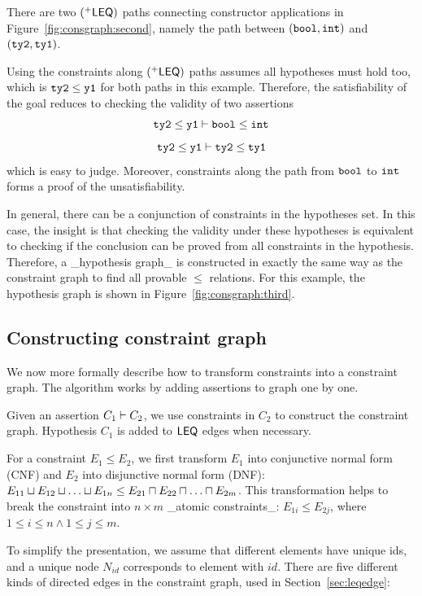 There are two $(^{+}\mathsf{LEQ})$ paths connecting constructor
applications in Figure~\ref{fig:consgraph:second}, namely the path
between $(\mathtt{bool, int})$ and $(\mathtt{ty2, ty1})$. 

Using the constraints along $(^{+}\mathsf{LEQ})$ paths assumes all
hypotheses must hold too, which is $\mathtt{ty2}\leq \mathtt{y1}$ for
both paths in this example. Therefore, the satisfiability of the goal
reduces to checking the validity of two assertions 
%
\[\mathtt{ty2}\leq \mathtt{y1}\vdash \mathtt{bool}\leq \mathtt{int}\]
\[\mathtt{ty2}\leq \mathtt{y1}\vdash \mathtt{ty2}\leq \mathtt{ty1}\]
\noindent
which is easy to judge. Moreover, constraints along the path from
$\mathtt{bool}$ to $\mathtt{int}$ forms a proof of the unsatisfiability.

In general, there can be a conjunction of constraints in the
hypotheses set. In this case, the insight is that checking the
validity under these hypotheses is equivalent to checking if the
conclusion can be proved from all constraints in the hypothesis.
Therefore, a _hypothesis graph_ is constructed in exactly the same way
as the constraint graph to find all provable $\leq$ relations. For
this example, the hypothesis graph is shown in
Figure~\ref{fig:consgraph:third}. 

\subsection{Constructing constraint graph}
\label{sec:consgraph}

We now more formally describe how to transform constraints
into a constraint graph. The algorithm works by adding assertions to
graph one by one.

Given an assertion $C_1 \vdash C_2$, we use constraints in $C_2$ to
construct the constraint graph. Hypothesis $C_1$ is added to $\mathsf{LEQ}$
edges when necessary.

For a constraint $E_1 \leq E_2$, we first transform $E_1$ into
conjunctive normal form (CNF) and $E_2$ into disjunctive normal form
(DNF): $E_{11}\join E_{12} \join \dots \join E_{1n} \leq E_{21}\meet
E_{22} \meet \dots \meet E_{2m}$. This transformation helps to break
the constraint into $n\times m$ _atomic constraints_: $E_{1i}\leq
E_{2j}$, where $1\leq i\leq n \land 1\leq j\leq m$.

To simplify the presentation, we assume that different elements have
unique ids, and a unique node $N_{id}$ corresponds to element with
$id$. There are five different kinds of directed edges in the
constraint graph, used in Section~\ref{sec:leqedge}:


